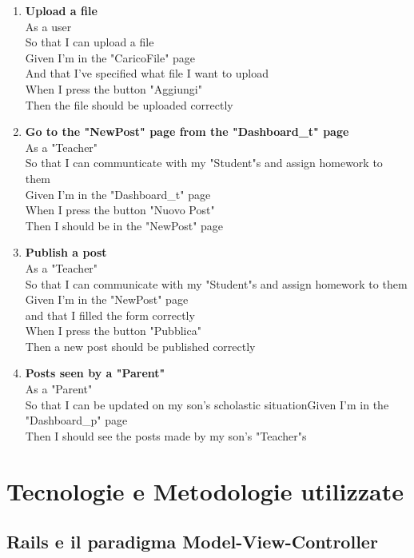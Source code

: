 \documentclass[Lau, binding=0.6cm]{sapthesis}
\begin{document}
\begin{enumerate}
	\item \textbf{Upload a file}\\
			As a user\\
			So that I can upload a file\\
			Given I’m in the "CaricoFile" page\\
			And that I’ve specified what file I want to upload\\
			When I press the button "Aggiungi"\\
			Then the file should be uploaded correctly\\
	\item \textbf{Go to the "NewPost" page from the "Dashboard\_t" page}\\
			As a "Teacher"\\
			So that I can communticate with my "Student"s and assign homework to them\\
			Given I’m in the "Dashboard\_t" page\\
			When I press the button "Nuovo Post"\\
			Then I should be in the "NewPost" page\\
	\item \textbf{Publish a post}\\
			As a "Teacher"\\
			So that I can communicate with my "Student"s and assign homework to them\\
			Given I’m in the "NewPost" page\\
			and that I filled the form correctly\\
			When I press the button "Pubblica"\\
			Then a new post should be published correctly\\
	\item \textbf{Posts seen by a "Parent"}\\
			As a "Parent"\\
			So that I can be updated on my son’s scholastic situationGiven I’m in the "Dashboard\_p" page\\
			Then I should see the posts made by my son’s "Teacher"s\\
\end{enumerate}

\chapter{Tecnologie e Metodologie utilizzate}

\section{Rails e il paradigma Model-View-Controller}
\end{document}
